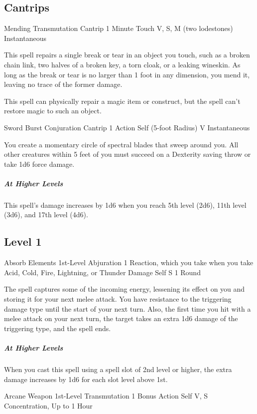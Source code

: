 \documentclass[letterpaper,openany,oneside,twocolumn]{book}
\begin{document}
\subsection*{Cantrips}

\DndSpellHeader
  {Mending}
  {Transmutation Cantrip}
  {1 Minute}
  {Touch}
  {V, S, M (two lodestones)}
  {Instantaneous}

This spell repairs a single break or tear in an object you touch, such as a broken chain link, two halves of a broken key, a torn cloak, or a leaking wineskin. As long as the break or tear is no larger than 1 foot in any dimension, you mend it, leaving no trace of the former damage.

This spell can physically repair a magic item or construct, but the spell can't restore magic to such an object.

\DndSpellHeader
  {Sword Burst}
  {Conjuration Cantrip}
  {1 Action}
  {Self (5-foot Radius)}
  {V}
  {Instantaneous}

You create a momentary circle of spectral blades that sweep around you. All other creatures within 5 feet of you must succeed on a Dexterity saving throw or take 1d6 force damage.

\subparagraph*{At Higher Levels} This spell's damage increases by 1d6 when you reach 5th level (2d6), 11th level (3d6), and 17th level (4d6).

\subsection*{Level 1}

\DndSpellHeader
  {Absorb Elements}
  {1st-Level Abjuration}
  {1 Reaction, which you take when you take Acid, Cold, Fire, Lightning, or Thunder Damage}
  {Self}
  {S}
  {1 Round}

The spell captures some of the incoming energy, lessening its effect on you and storing it for your next melee attack. You have resistance to the triggering damage type until the start of your next turn. Also, the first time you hit with a melee attack on your next turn, the target takes an extra 1d6 damage of the triggering type, and the spell ends.

\subparagraph*{At Higher Levels} When you cast this spell using a spell slot of 2nd level or higher, the extra damage increases by 1d6 for each slot level above 1st.

\DndSpellHeader
  {Arcane Weapon}
  {1st-Level Transmutation}
  {1 Bonus Action}
  {Self}
  {V, S}
  {Concentration, Up to 1 Hour}
\end{document}
